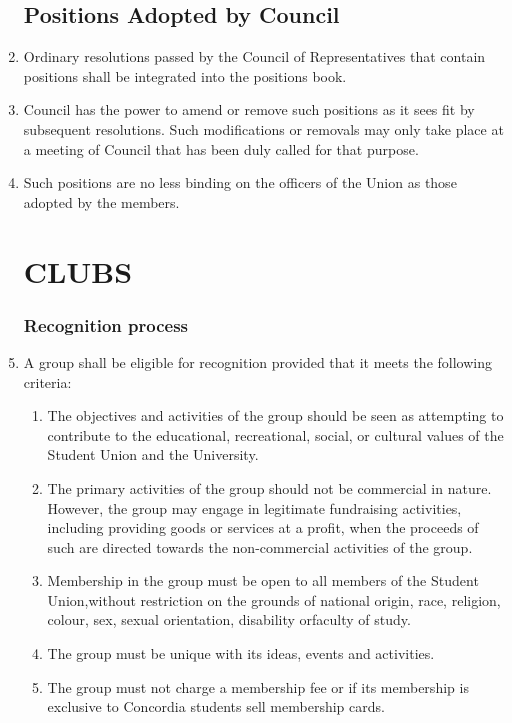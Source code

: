 \documentclass[oneside]{book}
\begin{document}
\begin{enumerate}
\chapter{\label{POSITIONS_ADOPTED_BY_COUNCIL}Positions Adopted by Council}

\item Ordinary resolutions passed by the Council of Representatives that contain positions 
shall be integrated into the positions book.
\item Council has the power to amend or remove such positions as it sees fit by subsequent 
resolutions. Such modifications or removals may only take place at a meeting of Council 
that has been duly called for that purpose.
\item Such positions are no less binding on the officers of the Union as those adopted by the members.


\part{\label{CLUBS}CLUBS}
\section{\label{Recognition_process}Recognition process}

\item \label{clubs_recognition_criteria} A group shall be eligible for recognition provided that it meets the
following criteria: 

	\begin{enumerate}
	\item The objectives and activities of the group should be seen as attempting
	to contribute to the educational, recreational, social, or cultural
	values of the Student Union and the University. 
	\item The primary activities of the group should not be commercial in nature.
	However, the group may engage in legitimate fundraising activities,
	including providing goods or services at a profit, when the proceeds
	of such are directed towards the non-commercial activities of the
	group. 
	\item Membership in the group must be open to all members of the Student
	Union,without restriction on the grounds of national origin, race,
	religion, colour, sex, sexual orientation, disability orfaculty of
	study. 
	\item The group must be unique with its ideas, events and activities. 
	\item The group must not charge a membership fee or if its membership is
	exclusive to Concordia students sell membership cards. 
	\end{enumerate}


\end{enumerate}
\end{document}
